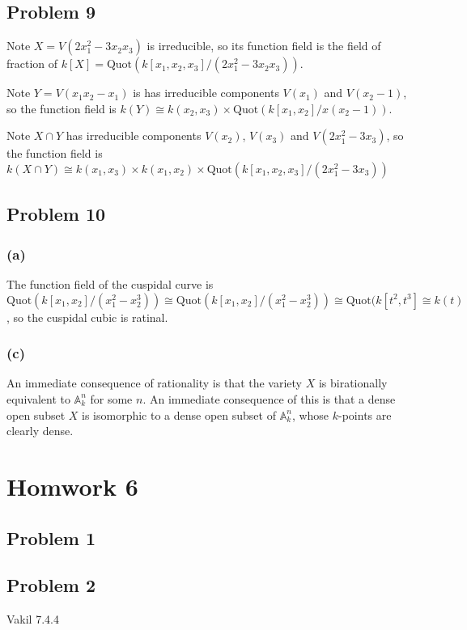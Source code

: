 \documentclass{article}
\theoremstyle{definition}
\theoremstyle{definition}
\theoremstyle{definition}
\theoremstyle{definition}
\theoremstyle{definition}
\theoremstyle{definition}
\theoremstyle{definition}
\begin{document}
\subsection*{Problem 9}
Note $X=V(2x_1^2-3x_2x_3)$ is irreducible, so its function field is the field of fraction of $k[X]=\textrm{Quot}(k[x_1,x_2,x_3]/(2x_1^2-3x_2x_3))$.

Note $Y=V(x_1x_2-x_1)$ is has irreducible components $V(x_1)$ and $V(x_2-1)$, so the function field is $k(Y)\cong k(x_2,x_3)\times \textrm{Quot}(k[x_1,x_2]/x(x_2-1))$.

Note $X\cap Y$ has irreducible components $V(x_2)$, $V(x_3)$ and $V(2x_1^2-3x_3)$, so the function field is $k(X\cap Y)\cong k(x_1,x_3)\times k(x_1,x_2)\times \textrm{Quot}(k[x_1,x_2,x_3]/(2x_1^2-3x_3))$


\subsection*{Problem 10}
\subsubsection*{(a)}
The function field of the cuspidal curve is \[\textrm{Quot}(k[x_1,x_2]/(x_1^2-x_2^3))\cong \textrm{Quot}(k[x_1,x_2]/(x_1^2-x_2^3))\cong \textrm{Quot}(k[t^2,t^3]\cong k(t)\], so the cuspidal cubic is ratinal.

\subsubsection*{(c)}
An immediate consequence of rationality is that the variety $X$ is birationally equivalent to $\mathbb{A}_k^n$ for some $n$. An immediate consequence of this is that a dense open subset $X$ is isomorphic to a dense open subset of $\mathbb{A}_k^n$, whose $k$-points are clearly dense. 


\section*{Homwork 6}

\subsection*{Problem 1}



\subsection*{Problem 2}
Vakil 7.4.4
\end{document}
